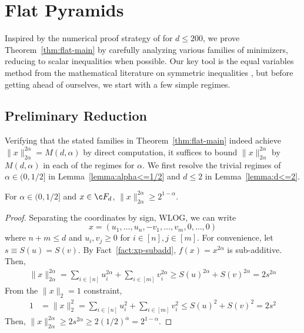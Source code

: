 \documentclass[11pt]{article}
\begin{document}
\section{Flat Pyramids}\label{sec:flat}
Inspired by the numerical proof strategy of \citep{holevo2026conjecturetightnorminequality} for $d\leq 200$, we prove Theorem~\ref{thm:flat-main} by carefully analyzing various families of minimizers, reducing to scalar inequalities when possible. Our key tool is the equal variables method from the mathematical literature on symmetric inequalities \citep{cirtoaje2006algebraic}, but before getting ahead of ourselves, we start with a few simple regimes.

\subsection{Preliminary Reduction}
Verifying that the stated families in Theorem~\ref{thm:flat-main} indeed achieve $\|x\|_{2\alpha}^{2\alpha}=M(d,\alpha)$ by direct computation, it suffices to bound $\|x\|_{2\alpha}^{2\alpha}$ by $M(d,\alpha)$ in each of the regimes for $\alpha$. We first resolve the trivial regimes of $\alpha\in (0,1/2]$ in Lemma~\ref{lemma:alpha<=1/2} and $d\leq 2$ in Lemma~\ref{lemma:d<=2}. 
\begin{lemma}\label{lemma:alpha<=1/2}
    For $\alpha \in (0,1/2]$ and $x\in \c F_d$, $\|x\|_{2\alpha}^{2\alpha}\geq 2^{1-\alpha}$.
\end{lemma}
\begin{proof}
Separating the coordinates by sign, WLOG, we can write 
$$x=(u_1,\dots,u_n,-v_1,\dots,v_m,0,\dots,0)$$
where $n+m\leq d$ and $u_i,v_j\geq 0$ for $i\in [n],j\in [m]$. For convenience, let $s\equiv S(u)=S(v)$. By Fact~\ref{fact:xp-subadd}, $f(x)=x^{2\alpha}$ is sub-additive. Then, 
   \begin{align*}
       \|x\|_{2\alpha}^{2\alpha}=\sum_{i\in [n]}u_i^{2\alpha}+\sum_{i\in [m]}v_i^{2\alpha}\geq S(u)^{2\alpha}+S(v)^{2\alpha}=2s^{2\alpha}
   \end{align*}
   From the $\|x\|_2=1$ constraint,
   \begin{align*}
       1&=\|x\|_2^2=\sum_{i\in [n]}u_i^2 +\sum_{i\in [m]}v_i^2\leq S(u)^2+S(v)^2=2s^2 
   \end{align*}
   Then, $ \|x\|_{2\alpha}^{2\alpha}\geq 2s^{2\alpha}\geq 2(1/2)^{\alpha}=2^{1-\alpha}$. 
\end{proof}
\end{document}
